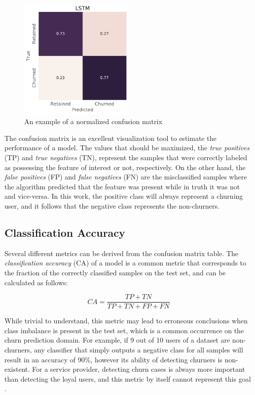 \documentclass{kththesis}
\begin{document}
\begin{figure}[h]
    \centering
    \includegraphics[width=0.5\textwidth,keepaspectratio]{figures/confusion_example.pdf}
    \caption{An example of a normalized confusion matrix}
    \label{fig:confusion_example}
\end{figure}

The confusion matrix is an excellent visualization tool to estimate the performance of a model. The values that should be maximized, the \emph{true positives} (TP) and \emph{true negatives} (TN), represent the samples that were correctly labeled as possessing the feature of interest or not, respectively. On the other hand, the \emph{false positives} (FP) and \emph{false negatives} (FN) are the misclassified samples where the algorithm predicted that the feature was present while in truth it was not and vice-versa. In this work, the positive class will always represent a churning user, and it follows that the negative class represents the non-churners.

\subsection{Classification Accuracy}

Several different metrics can be derived from the confusion matrix table. The \emph{classification accuracy} (CA) of a model is a common metric that corresponds to the fraction of the correctly classified samples on the test set, and can be calculated as follows:

\begin{equation}
CA = \frac{TP + TN}{TP + TN + FP + FN} 
\end{equation}

While trivial to understand, this metric may lead to erroneous conclusions when class imbalance is present in the test set, which is a common occurrence on the churn prediction domain. For example, if 9 out of 10 users of a dataset are non-churners, any classifier that simply outputs a negative class for all samples will result in an accuracy of 90\%, however its ability of detecting churners is non-existent. For a service provider, detecting churn cases is always more important than detecting the loyal users, and this metric by itself cannot represent this goal \citep{Burez2009} \citep{Hassouna2015}.
\end{document}
